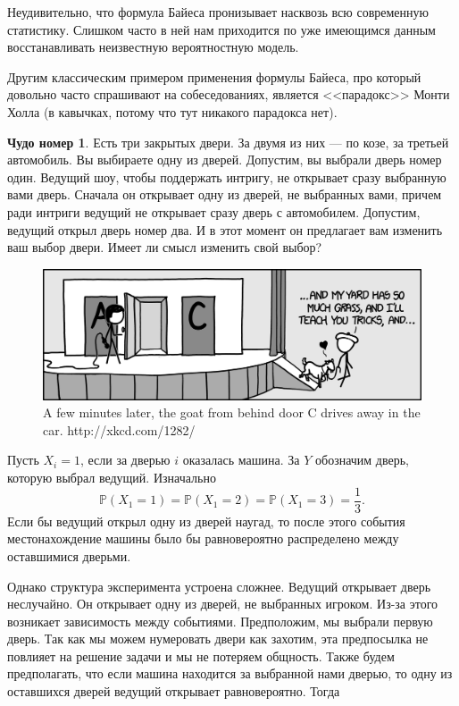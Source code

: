 \documentclass[12pt, a4paper, oneside]{extreport}
\def \mbb{\mathbb}
\def \PP{\mbb{P}}
\theoremstyle{plain}              %
\theoremstyle{definition}         %
\newtheorem{chudo}{Чудо номер}   %
\begin{document}
Неудивительно, что формула Байеса пронизывает насквозь всю современную статистику. Слишком часто в ней нам приходится по уже имеющимся данным восстанавливать неизвестную вероятностную модель. 

Другим классическим примером применения формулы Байеса, про который довольно часто спрашивают на собеседованиях, является  <<парадокс>> Монти Холла (в кавычках, потому что тут никакого парадокса нет).

\begin{chudo}
Есть три закрытых двери. За двумя из них — по козе, за третьей автомобиль. Вы выбираете одну из дверей. Допустим, вы выбрали дверь номер один.  Ведущий шоу, чтобы поддержать интригу, не открывает сразу выбранную вами дверь. Сначала он открывает одну из дверей, не выбранных вами, причем ради интриги ведущий не открывает сразу дверь с автомобилем. Допустим, ведущий открыл дверь номер два. И в этот момент он предлагает вам изменить ваш выбор двери. Имеет ли смысл изменить свой выбор? 
\end{chudo}

\begin{figure}
\begin{center}
\includegraphics[width=0.8\linewidth]{goat.png}
\end{center}
\caption{A few minutes later, the goat from behind door C drives away in the car. http://xkcd.com/1282/}
\end{figure}

Пусть $X_i = 1$, если за дверью $i$ оказалась машина. За $Y$ обозначим дверь, которую выбрал ведущий. Изначально \[\PP(X_1 = 1) = \PP(X_1 = 2) = \PP(X_1 = 3) = \frac{1}{3}.\]  Если бы ведущий открыл одну из дверей наугад, то после этого события местонахождение машины было бы равновероятно распределено между оставшимися дверьми. 

Однако структура эксперимента устроена сложнее. Ведущий открывает дверь неслучайно. Он открывает одну из дверей, не выбранных игроком.  Из-за этого возникает зависимость между событиями. Предположим, мы выбрали первую дверь. Так как мы можем нумеровать двери как захотим, эта предпосылка не повлияет на решение задачи и мы не потеряем общность. Также будем предполагать, что если машина находится за выбранной нами дверью, то одну из оставшихся дверей ведущий открывает равновероятно.  Тогда 
\end{document}
